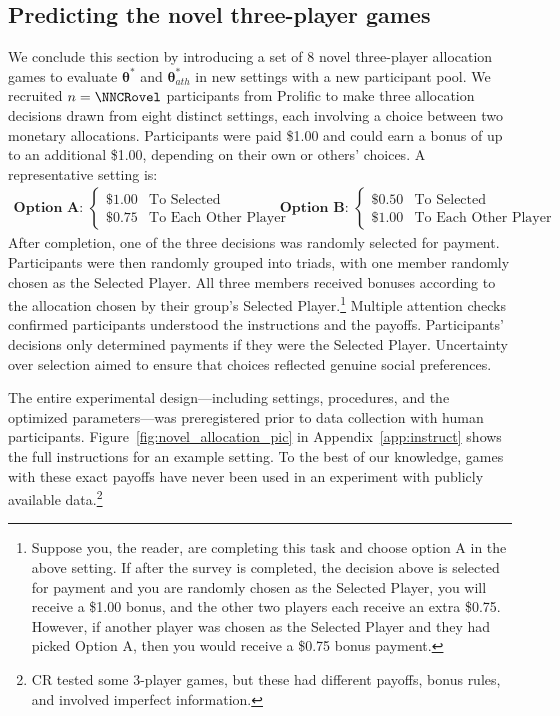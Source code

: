 \subsection{Predicting the novel three-player games}
\label{sec:cr_novel}

We conclude this section by introducing a set of 8 novel three-player allocation games to evaluate $\bm{\theta}^*$ and $\bm{\theta}_{ath}^*$ in new settings with a new participant pool.
We recruited $n = \NNCRovel$ participants from Prolific to make three allocation decisions drawn from eight distinct settings, each involving a choice between two monetary allocations.
Participants were paid \$1.00 and could earn a bonus of up to an additional \$1.00, depending on their own or others' choices. 
A representative setting is:
$$
\begin{array}{cc}
\mathbf{\textbf{Option A: }} \begin{cases}
\$1.00 & \text{To Selected} \\
\$0.75 & \text{To Each Other Player}
\end{cases}
&
\quad\quad
\mathbf{\textbf{Option B: }} \begin{cases}
\$0.50 & \text{To Selected} \\
\$1.00 & \text{To Each Other Player}
\end{cases}
\end{array}
$$
After completion, one of the three decisions was randomly selected for payment. 
Participants were then randomly grouped into triads, with one member randomly chosen as the Selected Player. 
All three members received bonuses according to the allocation chosen by their group's Selected Player.\footnote{Suppose you, the reader, are completing this task and choose option A in the above setting.
If after the survey is completed, the decision above is selected for payment and you are randomly chosen as the Selected Player, you will receive a \$1.00 bonus, and the other two players each receive an extra \$0.75.
However, if another player was chosen as the Selected Player and they had picked Option A, then you would receive a \$0.75 bonus payment.}
Multiple attention checks confirmed participants understood the instructions and the payoffs.
Participants' decisions only determined payments if they were the Selected Player.
Uncertainty over selection aimed to ensure that choices reflected genuine social preferences.

The entire experimental design---including settings, procedures, and the optimized \aisub{} parameters---was preregistered prior to data collection with human participants.
Figure~\ref{fig:novel_allocation_pic} in Appendix~\ref{app:instruct} shows the full instructions for an example setting.
To the best of our knowledge, games with these exact payoffs have never been used in an experiment with publicly available data.\footnote{CR tested some 3-player games, but these had different payoffs, bonus rules, and involved imperfect information.}


